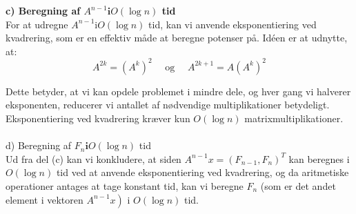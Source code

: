 \documentclass{article}
\begin{document}
\textbf{c) Beregning af $A^{n-1} \mathbf{i} O(\log n)$ tid}
\\

For at udregne $A^{n-1} \mathrm{i} O(\log n)$ tid, kan vi anvende eksponentiering ved kvadrering, som er en effektiv måde at beregne potenser på. Idéen er at udnytte, at:
$$
A^{2 k}=\left(A^k\right)^2 \quad \text { og } \quad A^{2 k+1}=A\left(A^k\right)^2
$$

Dette betyder, at vi kan opdele problemet i mindre dele, og hver gang vi halverer eksponenten, reducerer vi antallet af nødvendige multiplikationer betydeligt. Eksponentiering ved kvadrering kræver kun $O(\log n)$ matrixmultiplikationer.
\\
\\

d) Beregning af $F_n \mathbf{i} O(\log n)$ tid
\\

Ud fra del (c) kan vi konkludere, at siden $A^{n-1} x=\left(F_{n-1}, F_n\right)^T$ kan beregnes i $O(\log n)$ tid ved at anvende eksponentiering ved kvadrering, og da aritmetiske operationer antages at tage konstant tid, kan vi beregne $F_n$ (som er det andet element i vektoren $\left.A^{n-1} x\right)$ i $O(\log n)$ tid.
\end{document}
